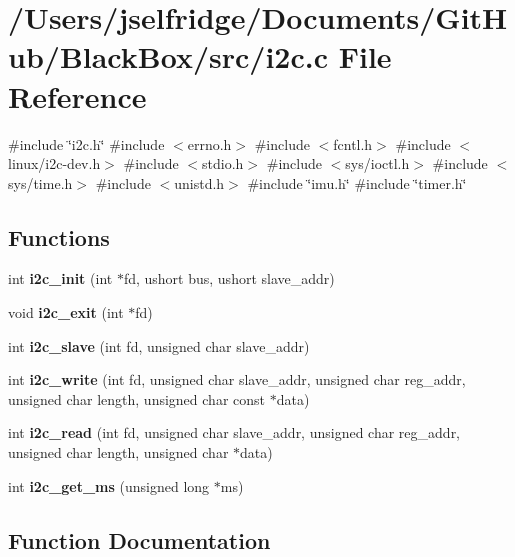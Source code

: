 \section{/\+Users/jselfridge/\+Documents/\+Git\+Hub/\+Black\+Box/src/i2c.c File Reference}
\label{i2c_8c}
{\ttfamily \#include \char`\"{}i2c.\+h\char`\"{}}\newline
{\ttfamily \#include $<$errno.\+h$>$}\newline
{\ttfamily \#include $<$fcntl.\+h$>$}\newline
{\ttfamily \#include $<$linux/i2c-\/dev.\+h$>$}\newline
{\ttfamily \#include $<$stdio.\+h$>$}\newline
{\ttfamily \#include $<$sys/ioctl.\+h$>$}\newline
{\ttfamily \#include $<$sys/time.\+h$>$}\newline
{\ttfamily \#include $<$unistd.\+h$>$}\newline
{\ttfamily \#include \char`\"{}imu.\+h\char`\"{}}\newline
{\ttfamily \#include \char`\"{}timer.\+h\char`\"{}}\newline
\subsection*{Functions}
\begin{DoxyCompactItemize}
\item 
int \textbf{ i2c\+\_\+init} (int $\ast$fd, ushort bus, ushort slave\+\_\+addr)
\item 
void \textbf{ i2c\+\_\+exit} (int $\ast$fd)
\item 
int \textbf{ i2c\+\_\+slave} (int fd, unsigned char slave\+\_\+addr)
\item 
int \textbf{ i2c\+\_\+write} (int fd, unsigned char slave\+\_\+addr, unsigned char reg\+\_\+addr, unsigned char length, unsigned char const $\ast$data)
\item 
int \textbf{ i2c\+\_\+read} (int fd, unsigned char slave\+\_\+addr, unsigned char reg\+\_\+addr, unsigned char length, unsigned char $\ast$data)
\item 
int \textbf{ i2c\+\_\+get\+\_\+ms} (unsigned long $\ast$ms)
\end{DoxyCompactItemize}


\subsection{Function Documentation}
\mbox{\label{i2c_8c_a6a4eb4288befb89cdb4c91388b991da3}} 
